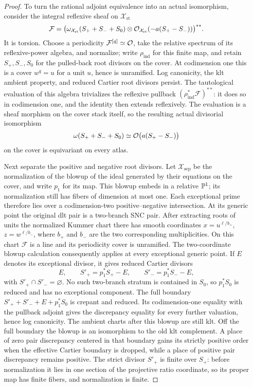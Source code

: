 \begin{proof}
To turn the rational adjoint equivalence into an actual isomorphism,
consider the integral reflexive sheaf on \(\mathcal X_{\mathrm{rt}}\)
\[
 \mathcal F=
 \bigl(\omega_{\mathcal X_{\mathrm{rt}}}(S_++S_-+S_0)\otimes
       \mathcal O_{\mathcal X_{\mathrm{rt}}}(-a(S_+-S_-))\bigr)^{**}.
\]
It is torsion.  Choose a periodicity
\(\mathcal F^{[q]}\simeq\mathcal O\), take the relative spectrum of its
reflexive-power algebra, and normalize; write \(\rho_{\mathrm{ind}}\)
for this finite map, and retain \(S_+,S_-,S_0\) for the pulled-back
root divisors on the cover.  At codimension one this
is a cover \(w^q=u\) for a unit \(u\), hence is unramified.
Log canonicity, the klt ambient property, and reduced Cartier
root divisors persist.  The tautological evaluation of this
algebra trivializes the reflexive pullback
\((\rho_{\mathrm{ind}}^*\mathcal F)^{**}\): it does so in
codimension one, and the identity then extends reflexively.
The evaluation is a sheaf morphism on the cover stack itself,
so the resulting actual divisorial isomorphism
\[
 \omega(S_++S_-+S_0)\simeq\mathcal O\bigl(a(S_+-S_-)\bigr)
\]
on the cover is equivariant on every atlas.

Next separate the positive and negative root divisors.  Let
\(\mathcal X_{\mathrm{sep}}\) be the normalization of the blowup of the
ideal generated by their equations on the cover, and write \(p_1\) for its
map.  This blowup embeds in a relative
\(\mathbb P^1\); its normalization still has fibers of dimension at
most one.  Each exceptional prime therefore lies over a
codimension-two positive--negative intersection.  At its generic
point the original dlt pair is a two-branch SNC pair.  After
extracting roots of units the normalized Kummer chart there has
smooth coordinates
\(x=u^{\ell/b_+}\), \(z=w^{\ell/b_-}\), where \(b_+\) and
\(b_-\) are the two corresponding multiplicities.  On this chart
\(\mathcal F\) is a line and its periodicity cover is unramified.
The two-coordinate blowup calculation consequently applies at
every exceptional generic point.  If \(E\) denotes its
exceptional divisor, it gives reduced Cartier divisors
\[
 E,\qquad S'_+=p_1^*S_+-E,\qquad S'_-=p_1^*S_--E,
\]
with \(S'_+\cap S'_-=\varnothing\).  No such two-branch stratum
is contained in \(S_0\), so \(p_1^*S_0\) is reduced and has no
exceptional component.  The full boundary
\(S'_++S'_-+E+p_1^*S_0\) is crepant and reduced.  Its
codimension-one equality with the pullback adjoint gives the
discrepancy equality for every further valuation, hence log
canonicity.  The ambient charts after this blowup are still
klt.  Off the full boundary the blowup is an isomorphism to
the old klt complement.  A place of zero pair discrepancy
centered in that boundary gains its strictly positive order
when the effective Cartier boundary is dropped, while a
place of positive pair discrepancy remains positive.  The
strict divisor \(S'_+\) is finite over \(S_+\):
before normalization it lies in one section of the projective
ratio coordinate, so its proper map has finite fibers, and
normalization is finite.


\end{proof}
